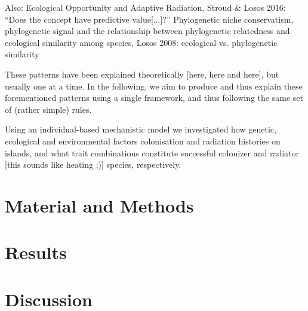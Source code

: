 \documentclass[a4paper]{scrartcl}
\begin{document}
Also: Ecological Opportunity and Adaptive Radiation, Stroud \& Losos 2016: ``Does the concept have predictive value[...]?'' \cite{stroud2016ecological}
Phylogenetic niche conservatism, phylogenetic signal and the relationship between phylogenetic relatedness and ecological similarity among species, Losos 2008: ecological vs. phylogenetic similarity \cite{losos2008phylogenetic}

These patterns have been explained theoretically [here, here and here], but usually one at a time.
In the following, we aim to produce and thus explain these forementioned patterns using a single framework, and thus following the same set of (rather simple) rules.

Using an individual-based mechanistic model we investigated how genetic, ecological and environmental factors colonisation and radiation histories on islands,
and what trait combinations constitute successful colonizer and radiator [this sounds like heating ;)] species, respectively.
\section{Material and Methods}

\section{Results}

\section{Discussion}


\printbibliography
\end{document}

